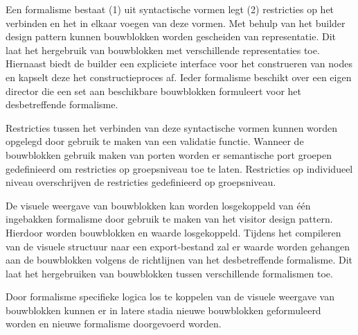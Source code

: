 Een formalisme bestaat (1) uit syntactische vormen legt (2) restricties op het verbinden en het in elkaar voegen van deze vormen. Met behulp van het builder design pattern kunnen bouwblokken worden gescheiden van representatie. Dit laat het hergebruik van bouwblokken met verschillende representaties toe. Hiernaast biedt de builder een expliciete interface voor het construeren van nodes en kapselt deze het constructieproces af. Ieder formalisme beschikt over een eigen director die een set aan beschikbare bouwblokken formuleert voor het desbetreffende formalisme.

Restricties tussen het verbinden van deze syntactische vormen kunnen worden opgelegd door gebruik te maken van een validatie functie. Wanneer de bouwblokken gebruik maken van porten worden er semantische port groepen gedefinieerd om restricties op groepsniveau toe te laten. Restricties op individueel niveau overschrijven de restricties gedefinieerd op groepsniveau. 

De visuele weergave van bouwblokken kan worden losgekoppeld van één ingebakken formalisme door gebruik te maken van het visitor design pattern. Hierdoor worden bouwblokken en waarde losgekoppeld. Tijdens het compileren van de visuele structuur naar een export-bestand zal er waarde worden gehangen aan de bouwblokken volgens de richtlijnen van het desbetreffende formalisme. Dit laat het hergebruiken van bouwblokken tussen verschillende formalismen toe.

Door formalisme specifieke logica los te koppelen van de visuele weergave van bouwblokken kunnen er in latere stadia nieuwe bouwblokken geformuleerd worden en nieuwe formalisme doorgevoerd worden.